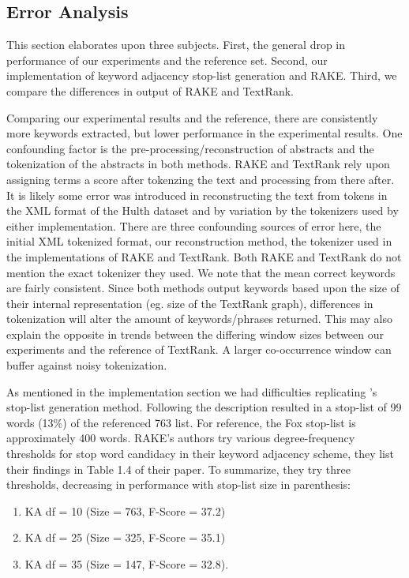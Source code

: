 \documentclass[11pt,a4paper]{article}
\begin{document}
\subsection{Error Analysis}
This section elaborates upon three subjects. First, the general drop in performance of our experiments and the reference set. Second, our implementation of keyword adjacency stop-list generation and RAKE. Third, we compare the differences in output of RAKE and TextRank.

Comparing our experimental results and the reference, there are consistently more keywords extracted, but lower performance in the experimental results. One confounding factor is the pre-processing/reconstruction of abstracts and the tokenization of the abstracts in both methods. RAKE and TextRank rely upon assigning terms a score after tokenzing the text and processing from there after. It is likely some error was introduced in reconstructing the text from tokens in the XML format of the Hulth dataset and by variation by the tokenizers used by either implementation. There are three confounding sources of error here, the initial XML tokenized format, our reconstruction method, the tokenizer used in the implementations of RAKE and TextRank. Both RAKE and TextRank do not mention the exact tokenizer they used. We note that the mean correct keywords are fairly consistent. Since both methods output keywords based upon the size of their internal representation (eg. size of the TextRank graph), differences in tokenization will alter the amount of keywords/phrases returned. This may also explain the opposite in trends between the differing window sizes between our experiments and the reference of TextRank. A larger co-occurrence window can buffer against noisy tokenization. 

As mentioned in the implementation section we had difficulties replicating \citet{1}'s stop-list generation method. Following the description resulted in a stop-list of 99 words (13\%) of the referenced 763 list. For reference, the Fox stop-list is approximately 400 words. RAKE's authors try various degree-frequency thresholds for stop word candidacy in their keyword adjacency scheme, they list their findings in Table 1.4 of their paper. To summarize, they try three thresholds, decreasing in performance with stop-list size in parenthesis: 
\begin{enumerate}
	\small \itemsep0em 

	\item KA df = 10 (Size = 763, F-Score = 37.2)
	\item KA df = 25 (Size = 325, F-Score = 35.1)
	\item KA df = 35 (Size = 147, F-Score = 32.8).
	
\normalsize
\end{enumerate}  
\end{document}
